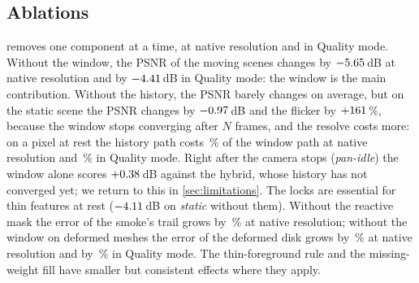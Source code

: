 \documentclass[11pt,a4paper]{article}
\begin{document}
\subsection{Ablations}

\begin{table}[t]
\centering
\caption{Ablations: each variant removes one component. PSNR changes are means over the scenes the component acts on: history only, pan, cables, floor, fast floor, deform and smoke; window only, pan-idle and static; missing-weight fill, the same as history only without smoke; locks, pan-idle, static, floor and fast floor; the others, the scene of their targeted region. On every other scene of the ablation set the change is at most \nAblNoMissingFillRest{}\,dB, except for the history-only variant, which also changes pan-idle by $\nAblHistoryOnlyPausestopNat$\,dB. The last two columns give the relative change of the targeted region error or flicker.}
\label{tab:ablation}
\small\setlength{\tabcolsep}{4pt}

\end{table}

 removes one component at a time, at native resolution and in Quality mode. Without the window, the PSNR of the moving scenes changes by $-5.65$\,dB at native resolution and by $-4.41$\,dB in Quality mode: the window is the main contribution. Without the history, the PSNR barely changes on average, but on the static scene the PSNR changes by $-0.97$\,dB and the flicker by $+161$\,\%, because the window stops converging after $N$ frames, and the resolve costs more: on a pixel at rest the history path costs \nHistShareNat\,\% of the window path at native resolution and \nHistShareQ\,\% in Quality mode. Right after the camera stops (\emph{pan-idle}) the window alone scores $+0.38$\,dB against the hybrid, whose history has not converged yet; we return to this in \cref{sec:limitations}. The locks are essential for thin features at rest ($-4.11$\,dB on \emph{static} without them). Without the reactive mask the error of the smoke's trail grows by \nAblNoReactiveTgtNatAbs\,\% at native resolution; without the window on deformed meshes the error of the deformed disk grows by \nAblNoDeformedWindowTgtNatAbs\,\% at native resolution and by \nAblNoDeformedWindowTgtQAbs\,\% in Quality mode. The thin-foreground rule and the missing-weight fill have smaller but consistent effects where they apply.
\end{document}
